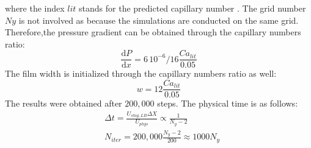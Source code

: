 \documentclass{article}
\begin{document}
where the index $lit$ stands for the predicted capillary number
\cite{giavedoni-numerical,heil-bretherton}. The grid number $Ny$ is not
involved as because the simulations are conducted on the same grid.
Therefore,the pressure gradient can be obtained through the capillary numbers
ratio:
\begin{equation}
\frac{\mathrm{d}P}{\mathrm{d} x}=6\,10^{-6}/16 \frac{Ca_{lit}}{0.05}
\end{equation}
The film width is initialized through the capillary numbers ratio as well:
\begin{equation*}
w=12 \frac{Ca_{lit}}{0.05}
\end{equation*}
The results were obtained after $200,000$ steps.
The physical
time is as follows:
\begin{equation}
\begin{aligned}
&\Delta t=\frac{U_{slug,LB} \Delta X}{U_{phys}} \propto \frac{1}{N_y-2}\\
&N_{iter}=200,000 \frac{N_y-2}{200}\approx 1000 N_y\\
\end{aligned}
\end{equation}
\end{document}
